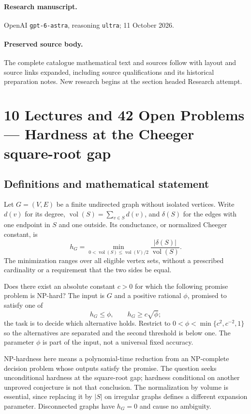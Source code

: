 \documentclass[11pt,a4paper]{article}
\begin{document}
\paragraph{Research manuscript.} OpenAI \texttt{gpt-6-astra}, reasoning \texttt{ultra}; 11 October 2026.
\paragraph{Preserved source body.} The complete catalogue mathematical text and sources follow with layout and source links expanded, including source qualifications and its historical preparation notes. New research begins at the section headed Research attempt.

\section*{10 Lectures and 42 Open Problems — Hardness at the Cheeger square-root gap}\label{statement}

\subsection{Definitions and mathematical statement}
Let $G=(V,E)$ be a finite undirected graph without isolated vertices.
Write $d(v)$ for its degree, $\operatorname{vol}(S)=\sum_{v\in S}d(v)$,
and $\delta(S)$ for the edges with one endpoint in $S$ and one outside.
Its conductance, or normalized Cheeger constant, is
\[
 h_G=\min_{0<\operatorname{vol}(S)\le\operatorname{vol}(V)/2}
                   \frac{|\delta(S)|}{\operatorname{vol}(S)}.
\]
The minimization ranges over all eligible vertex sets, without a
prescribed cardinality or a requirement that the two sides be equal.

Does there exist an absolute constant $c>0$ for which the following
promise problem is NP-hard? The input is $G$ and a positive rational
$\phi$, promised to satisfy one of
\[
                 h_G\le\phi,
                 \qquad h_G\ge c\sqrt\phi;
\]
the task is to decide which alternative holds. Restrict to
$0<\phi<\min\{c^2,c^{-2},1\}$ so the alternatives are separated and
the second threshold is below one. The parameter $\phi$ is part of
the input, not a universal fixed accuracy.

NP-hardness here means a polynomial-time reduction from an NP-complete
decision problem whose outputs satisfy the promise. The question seeks
unconditional hardness at the square-root gap; hardness conditional
on another unproved conjecture is not that conclusion. The normalization
by volume is essential, since replacing it by $|S|$ on irregular graphs
defines a different expansion parameter. Disconnected graphs have
$h_G=0$ and cause no ambiguity.
\end{document}
